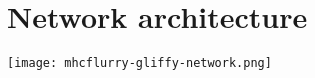 
\section{Network architecture}

\graphicspath{ {images/} } 
\texttt{[image: mhcflurry-gliffy-network.png]}